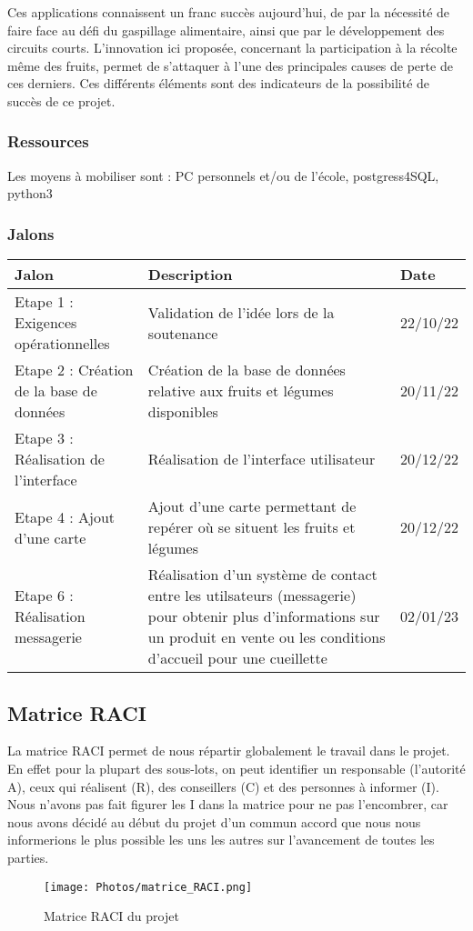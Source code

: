 \documentclass{article}
\begin{document}
Ces applications connaissent un franc succès aujourd'hui, de par la nécessité de faire face au défi du gaspillage alimentaire, ainsi que par le développement des circuits courts. L'innovation ici proposée, concernant la participation à la récolte même des fruits, permet de s'attaquer à l'une des principales causes de perte de ces derniers. Ces différents éléments sont des indicateurs de la possibilité de succès de ce projet.

\subsubsection{Ressources}
Les moyens à mobiliser sont :
PC personnels et/ou de l'école, postgress4SQL, python3 


\subsubsection{Jalons}
\begin{center}
\begin{tabular}{|p{3cm}|p{5cm}|p{2cm}|} 
  \hline
  Jalon & Description & Date \\
  \hline
  Etape 1 : Exigences opérationnelles & Validation de l'idée lors de la soutenance & 22/10/22 \\
  \hline
  Etape 2 : Création de la base de données & Création de la base de données relative aux fruits et légumes disponibles & 20/11/22 \\
  \hline
  Etape 3 : Réalisation de l'interface & Réalisation de l'interface utilisateur & 20/12/22 \\
  \hline
  Etape 4 : Ajout d'une carte & Ajout d'une carte permettant de repérer où se situent les fruits et légumes & 20/12/22 \\
  \hline
  Etape 6 : Réalisation messagerie & 
  Réalisation d'un système de contact entre les utilsateurs (messagerie) pour obtenir plus d'informations sur un produit en vente ou les conditions d'accueil pour une cueillette & 02/01/23 \\
  \hline
\end{tabular}
\end{center}


\subsection{Matrice RACI}
La matrice RACI permet de nous répartir globalement le travail dans le projet. En
effet pour la plupart des sous-lots, on peut identifier un responsable (l’autorité A), ceux
qui réalisent (R), des conseillers (C) et des personnes à informer (I). Nous n’avons pas fait
figurer les I dans la matrice pour ne pas l’encombrer, car nous avons décidé au début du
projet d’un commun accord que nous nous informerions le plus possible les uns les autres sur
l’avancement de toutes les parties.
\begin{figure}
    \centering
    \texttt{[image: Photos/matrice\_RACI.png]}
    \caption{Matrice RACI du projet}
    \label{fig:my_label}
\end{figure}
\end{document}
